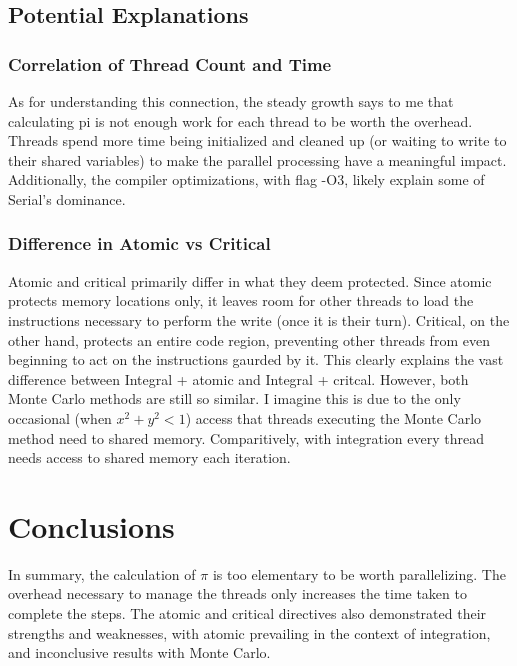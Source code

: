 \documentclass[11pt]{article}
\begin{document}
\subsection{Potential Explanations}
\subsubsection{Correlation of Thread Count and Time}
As for understanding this connection, the steady growth says to me that calculating pi is not enough work for each thread to be worth the overhead. Threads spend more time being initialized and cleaned up (or waiting to write to their shared variables) to make the parallel processing have a meaningful impact. Additionally, the compiler optimizations, with flag -O3, likely explain some of Serial's dominance.
\subsubsection{Difference in Atomic vs Critical}
Atomic and critical primarily differ in what they deem protected. Since atomic protects memory locations only, it leaves room for other threads to load the instructions necessary to perform the write (once it is their turn). Critical, on the other hand, protects an entire code region, preventing other threads from even beginning to act on the instructions gaurded by it. This clearly explains the vast difference between Integral + atomic and Integral + critcal. However, both Monte Carlo methods are still so similar. I imagine this is due to the only occasional (when $x^2 + y^2 < 1$) access that threads executing the Monte Carlo method need to shared memory. Comparitively, with integration every thread needs access to shared memory each iteration. 
\section{Conclusions}
In summary, the calculation of $\pi$ is too elementary to be worth parallelizing. The overhead necessary to manage the threads only increases the time taken to complete the steps. The atomic and critical directives also demonstrated their strengths and weaknesses, with atomic prevailing in the context of integration, and inconclusive results with Monte Carlo.
\end{document}
